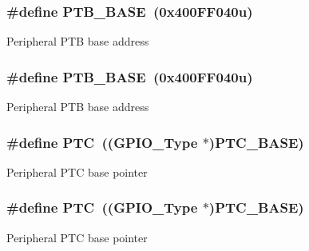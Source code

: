 \subsubsection[{\texorpdfstring{P\+T\+B\+\_\+\+B\+A\+SE}{PTB_BASE}}]{\setlength{\rightskip}{0pt plus 5cm}\#define P\+T\+B\+\_\+\+B\+A\+SE~(0x400\+F\+F040u)}\hypertarget{group__GPIO__Peripheral__Access__Layer_ga8cd67de0ed62c0fe8395cc6e40af2451}{}\label{group__GPIO__Peripheral__Access__Layer_ga8cd67de0ed62c0fe8395cc6e40af2451}
Peripheral P\+TB base address 
\subsubsection[{\texorpdfstring{P\+T\+B\+\_\+\+B\+A\+SE}{PTB_BASE}}]{\setlength{\rightskip}{0pt plus 5cm}\#define P\+T\+B\+\_\+\+B\+A\+SE~(0x400\+F\+F040u)}\hypertarget{group__GPIO__Peripheral__Access__Layer_ga8cd67de0ed62c0fe8395cc6e40af2451}{}\label{group__GPIO__Peripheral__Access__Layer_ga8cd67de0ed62c0fe8395cc6e40af2451}
Peripheral P\+TB base address 
\subsubsection[{\texorpdfstring{P\+TC}{PTC}}]{\setlength{\rightskip}{0pt plus 5cm}\#define P\+TC~(({\bf G\+P\+I\+O\+\_\+\+Type} $\ast$){\bf P\+T\+C\+\_\+\+B\+A\+SE})}\hypertarget{group__GPIO__Peripheral__Access__Layer_ga7deefa3e1c7e45e4ccb31a8117bc181f}{}\label{group__GPIO__Peripheral__Access__Layer_ga7deefa3e1c7e45e4ccb31a8117bc181f}
Peripheral P\+TC base pointer 
\subsubsection[{\texorpdfstring{P\+TC}{PTC}}]{\setlength{\rightskip}{0pt plus 5cm}\#define P\+TC~(({\bf G\+P\+I\+O\+\_\+\+Type} $\ast$){\bf P\+T\+C\+\_\+\+B\+A\+SE})}\hypertarget{group__GPIO__Peripheral__Access__Layer_ga7deefa3e1c7e45e4ccb31a8117bc181f}{}\label{group__GPIO__Peripheral__Access__Layer_ga7deefa3e1c7e45e4ccb31a8117bc181f}
Peripheral P\+TC base pointer 
